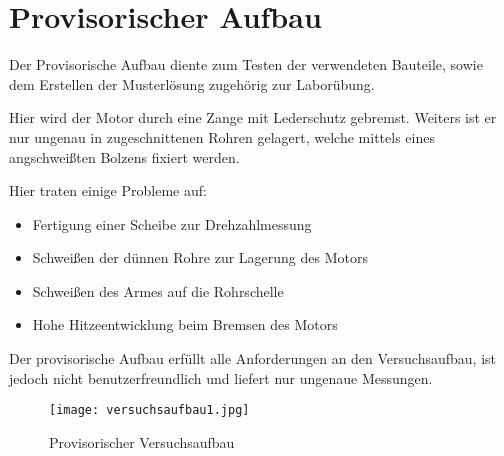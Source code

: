 \section{Provisorischer Aufbau}
\label{provi}

Der Provisorische Aufbau diente zum Testen der verwendeten Bauteile, sowie dem Erstellen der Musterlösung zugehörig zur Laborübung.

Hier wird der Motor durch eine Zange mit Lederschutz gebremst.
Weiters ist er nur ungenau in zugeschnittenen Rohren gelagert, welche mittels eines angschweißten Bolzens fixiert werden.

Hier traten einige Probleme auf:

\begin{itemize}
    \item Fertigung einer Scheibe zur Drehzahlmessung
    \item Schweißen der dünnen Rohre zur Lagerung des Motors
    \item Schweißen des Armes auf die Rohrschelle
    \item Hohe Hitzeentwicklung beim Bremsen des Motors
\end{itemize}

Der provisorische Aufbau erfüllt alle Anforderungen an den Versuchsaufbau, ist jedoch nicht benutzerfreundlich und liefert nur ungenaue Messungen.

\begin{figure}[H]
    \begin{center}
        \texttt{[image: versuchsaufbau1.jpg]}
        \caption{Provisorischer Versuchsaufbau}
    \end{center}
\end{figure}